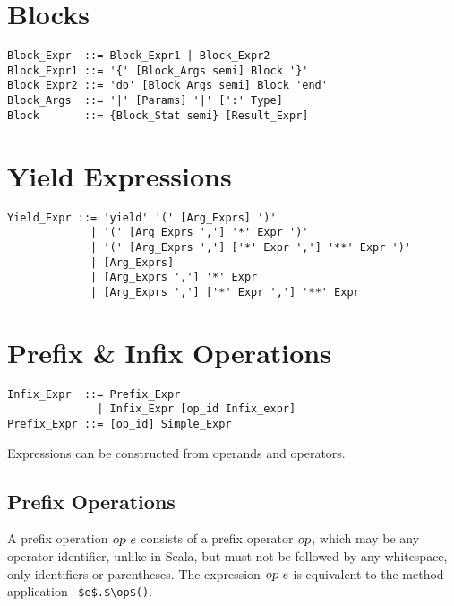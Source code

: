\section{Blocks}

\syntax\begin{lstlisting}
Block_Expr  ::= Block_Expr1 | Block_Expr2
Block_Expr1 ::= '{' [Block_Args semi] Block '}'
Block_Expr2 ::= 'do' [Block_Args semi] Block 'end'
Block_Args  ::= '|' [Params] '|' [':' Type]
Block       ::= {Block_Stat semi} [Result_Expr]
\end{lstlisting}






\section{Yield Expressions}

\syntax\begin{lstlisting}
Yield_Expr ::= 'yield' '(' [Arg_Exprs] ')'
             | '(' [Arg_Exprs ','] '*' Expr ')'
             | '(' [Arg_Exprs ','] ['*' Expr ','] '**' Expr ')'
             | [Arg_Exprs]
             | [Arg_Exprs ','] '*' Expr
             | [Arg_Exprs ','] ['*' Expr ','] '**' Expr
\end{lstlisting}







\section{Prefix \& Infix Operations}
\label{sec:prefix-infix-ops}

\syntax\begin{lstlisting}
Infix_Expr  ::= Prefix_Expr
              | Infix_Expr [op_id Infix_expr]
Prefix_Expr ::= [op_id] Simple_Expr
\end{lstlisting}

Expressions can be constructed from operands and operators. 





\subsection{Prefix Operations}

A prefix operation $\mbox{\sl op}\ e$ consists of a prefix operator $\mbox{\sl op}$, which may be any operator identifier, unlike in Scala, but must not be followed by any whitespace, only identifiers or parentheses. The expression $\mbox{\sl op}\ e$ is equivalent to the method application ~\lstinline!$e$.$\op$()!. 





